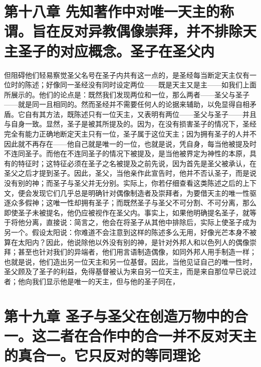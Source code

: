 
\section{第十八章  先知著作中对唯一天主的称谓。旨在反对异教偶像崇拜，并不排除天主圣子的对应概念。圣子在圣父内}

但阻碍他们轻易察觉圣父名号在圣子内共有这一点的，是圣经每当断定天主仅有一位时的陈述；好像同一圣经没有同时设定两位——既是天主又是主——如我们上面所展示的。他们的论点是：既然我们发现两位和一位，那么两者——圣父与圣子——就是同一且相同的。然而圣经并不需要任何人的论据来辅助，以免显得自相矛盾。它自有其方法，既陈述只有一位天主，又表明有两位——圣父与圣子——并且与自身一致。显然，圣子是被其所提及的。因为，在没有损害圣子的情况下，圣经完全有能力正确地断定天主只有一位，圣子属于这位天主；因为拥有圣子的人并不因此就不再存在——他自己就是唯一的一位，也就是说，凭自身，每当他被提及时不连同圣子。而他在不连同圣子的情况下被提及，是当他被界定为神性的本原，具有的特征时；这特征必须在圣子之名被提及之前先说，因为首先是圣父被承认，在圣父之后才提到圣子。因此，圣父，当他亲作此宣告时，他并不否认圣子，而是说没有别的神；而圣子与圣父并无分别。实际上，你若仔细查看这类陈述之后的上下文，便会发现它们几乎总是明确针对偶像制造者及崇拜者，为要借天主的唯一性驱逐众多假神；这唯一性却拥有圣子；而既然圣子与圣父不可分割、不可分离，那么即使圣子未被提名，他仍应被视作在圣父内。事实上，如果他明确提名圣子，就等于将他分离，直接说：简言之，他会在将圣子从其他中排除后，实际上使圣子成为另一个。假设太阳说：你难道不会注意到这样的陈述多么无用，好像光芒本身不被算在太阳内？因此，他说除他以外没有别的神，是针对外邦人和以色列人的偶像崇拜；甚至也针对我们的异端者，他们用言语制造偶像，如同外邦人用手制造一样；也就是说，他们造出另一位天主和另一位基督。因此，当他见证自己的唯一性时，圣父顾及了圣子的利益，免得基督被认为来自另一位天主，而是来自那位早已说过者；他向我们显示他是唯一的天主，但与他的圣子同在，\par


\section{第十九章  圣子与圣父在创造万物中的合一。这二者在合作中的合一并不反对天主的真合一。它只反对的等同理论}

